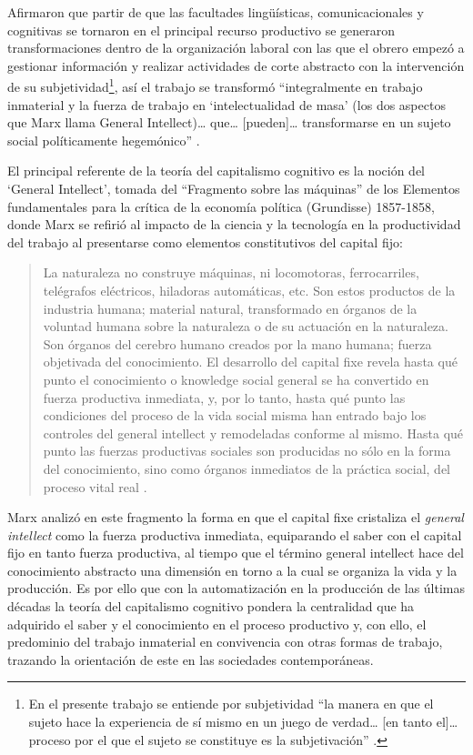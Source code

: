 \documentclass[
  spanish,
  11pt,
  a4paper,
]{scrbook}
\begin{document}
Afirmaron que partir de que las facultades lingüísticas,
comunicacionales y cognitivas se tornaron en el principal recurso
productivo se generaron transformaciones dentro de la organización
laboral con las que el obrero empezó a gestionar información y realizar
actividades de corte abstracto con la intervención de su
subjetividad\footnote{En el presente trabajo se entiende por
  subjetividad ``la manera en que el sujeto hace la experiencia de sí
  mismo en un juego de verdad\ldots{} {[}en tanto el{]}\ldots{} proceso
  por el que el sujeto se constituye es la subjetivación''
  \autocite[16]{Foucault1999}.}, así el trabajo se transformó
``integralmente en trabajo inmaterial y la fuerza de trabajo en
`intelectualidad de masa' (los dos aspectos que Marx llama General
Intellect)\ldots{} que\ldots{} {[}pueden{]}\ldots{} transformarse en un
sujeto social políticamente hegemónico'' \autocite[12]{Negri2001}.

El principal referente de la teoría del capitalismo cognitivo es la
noción del `General Intellect', tomada del ``Fragmento sobre las
máquinas'' de los Elementos fundamentales para la crítica de la economía
política (Grundisse) 1857-1858, donde Marx se refirió al impacto de la
ciencia y la tecnología en la productividad del trabajo al presentarse
como elementos constitutivos del capital fijo:

\begin{quote}
La naturaleza no construye máquinas, ni locomotoras, ferrocarriles,
telégrafos eléctricos, hiladoras automáticas, etc. Son estos productos
de la industria humana; material natural, transformado en órganos de la
voluntad humana sobre la naturaleza o de su actuación en la naturaleza.
Son órganos del cerebro humano creados por la mano humana; fuerza
objetivada del conocimiento. El desarrollo del capital fixe revela hasta
qué punto el conocimiento o knowledge social general se ha convertido en
fuerza productiva inmediata, y, por lo tanto, hasta qué punto las
condiciones del proceso de la vida social misma han entrado bajo los
controles del general intellect y remodeladas conforme al mismo. Hasta
qué punto las fuerzas productivas sociales son producidas no sólo en la
forma del conocimiento, sino como órganos inmediatos de la práctica
social, del proceso vital real \autocite[229-230]{Marx1997grundrisse}.
\end{quote}

Marx analizó en este fragmento la forma en que el capital fixe
cristaliza el \emph{general intellect} como la fuerza productiva
inmediata, equiparando el saber con el capital fijo en tanto fuerza
productiva, al tiempo que el término general intellect hace del
conocimiento abstracto una dimensión en torno a la cual se organiza la
vida y la producción. Es por ello que con la automatización en la
producción de las últimas décadas la teoría del capitalismo cognitivo
pondera la centralidad que ha adquirido el saber y el conocimiento en el
proceso productivo y, con ello, el predominio del trabajo inmaterial en
convivencia con otras formas de trabajo, trazando la orientación de este
en las sociedades contemporáneas.
\end{document}
